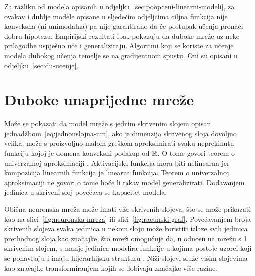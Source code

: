 \documentclass[utf8, diplomski, lmodern]{fer}
\begin{document}
Za razliku od modela opisanih u odjeljku~\ref{sec:poopceni-linearni-modeli}, za ovakav i dublje modele opisane u sljedećim odjeljcima ciljna funkcija nije konveksna (ni unimodalna) pa nije garantirano da će postupak učenja pronaći dobru hipotezu. Empirijski rezultati ipak pokazuju da duboke mreže uz neke prilagodbe uspješno uče i generaliziraju. Algoritmi koji se koriste za učenje modela dubokog učenja temelje se na gradijentnom spustu. Oni su opisani u odjeljku~\ref{sec:du-ucenje}.


\section{Duboke unaprijedne mreže}

Može se pokazati da model mreže s jednim skrivenim slojem opisan jednadžbom~\eqref{eq:jednonslojna-nm}, ako je dimenzija skrivenog sloja dovoljno velika, može s proizvoljno malom greškom aproksimirati svaku neprekinutu funkciju kojoj je domena konveksni podskup od $\mathbb{R}$. O tome govori teorem o univerzalnoj aproksimaciji \citep{Cybenko:ASSF:1989,Leshno:1993:MFFNWNPA}. Aktivacijska funkcija mora biti nelinearna jer kompozicija linearnih funkcija je linearna funkcija. Teorem o univerzalnoj aproksimaciji ne govori o tome hoće li takav model generalizirati. Dodavanjem jedinica u skriveni sloj povećava se kapacitet modela.

Obična neuronska mreža može imati više skrivenih slojeva, što se može prikazati kao na slici~\ref{fig:neuronska-mreza} ili slici~\ref{fig:racunski-graf}. Povećavanjem broja skrivenih slojeva svaka jedinica u nekom sloju može koristiti izlaze svih jedinica prethodnog sloja kao značajke, što mreži omogućuje da, u odnosu na mrežu s 1 skrivenim slojem, s manje jedinica modelira funkcije u kojima postoje uzorci koji se ponavljaju i imaju hijerarhijsku strukturu \citep{Goodfellow:2016:DL}. Niži slojevi služe višim slojevima kao značajke transformiranjem kojih se dobivaju značajke više razine.
\end{document}
